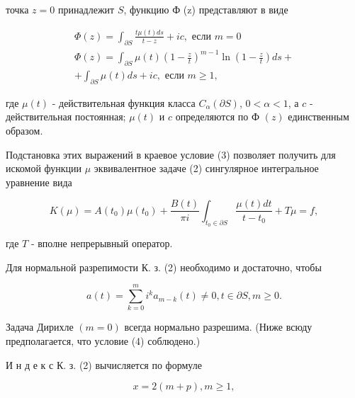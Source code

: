 \documentclass[10pt]{article}
\begin{document}
точка $z=0$ принадлежит $S$, функцию Ф (z) представляют в виде



\[

\begin{gathered}

\Phi(z)=\int_{\partial S} \frac{t \mu(t) d s}{t-z}+i c, \text { если } m=0 \\

\Phi(z)=\int_{\partial S} \mu(t)\left(1-\frac{z}{t}\right)^{m-1} \ln \left(1-\frac{z}{t}\right) d s+ \\

+\int_{\partial S} \mu(t) d s+i c, \text { если } m \geqslant 1,

\end{gathered}

\]



где $\mu(t)$ - действительная функция класса $C_{\alpha}(\partial S)$, $0<\alpha<1$, а $c$ - действительная постоянная; $\mu(t)$ и $c$ определяются по Ф $(z)$ единственным образом.



Подстановка этих выражений в краевое условие (3) позволяет получить для искомой функции $\mu$ эквивалентное задаче (2) сингулярное интегральное уравнение вида



\[

K(\mu)=A\left(t_{0}\right) \mu\left(t_{0}\right)+\frac{B(t)}{\pi i} \int_{t_{0} \in \partial S} \frac{\mu(t) d t}{t-t_{0}}+T \mu=f,

\]



где $T$ - вполне непрерывный оператор.



Для нормальной разрепимости К. з. (2) необходимо и достаточно, чтобы



\[

a(t)=\sum_{k=0}^{m} i^{k} a_{m-k}(t) \neq 0, t \in \partial S, m \geqslant 0 .

\]



Задача Дирихле $(m=0)$ всегда нормально разрешима. (Ниже всюду предполагается, что условие (4) соблюдено.)



И н д е к с К. з. (2) вычисляется по формуле



\[

x=2(m+p), m \geqslant 1,

\]
\end{document}
